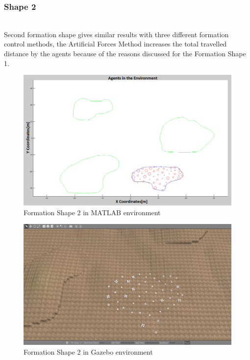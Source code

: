 \subsubsection{Shape 2}\hspace{0pt} \\
Second formation shape gives similar results with three different formation control methods, the Artificial Forces Method increases the total travelled distance by the agents because of the reasons discussed for the Formation Shape 1.

\begin{figure}[H]
\caption{Formation Shape 2 in MATLAB environment}
\centerline{\includegraphics[scale = 0.32]{Trajectories_Formation_Shape_2_2}}
\end{figure} 	
		   
\begin{figure}[H]
\caption{Formation Shape 2 in Gazebo environment}
\centerline{\includegraphics[scale = 0.32]{Trajectories_Formation_Shape_2_1}}
\end{figure} 	
		   

